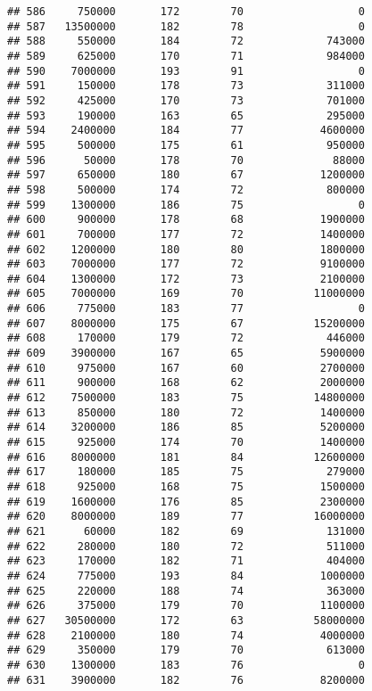 \documentclass[
]{article}
\begin{document}
\begin{verbatim}
## 586     750000       172        70                  0
## 587   13500000       182        78                  0
## 588     550000       184        72             743000
## 589     625000       170        71             984000
## 590    7000000       193        91                  0
## 591     150000       178        73             311000
## 592     425000       170        73             701000
## 593     190000       163        65             295000
## 594    2400000       184        77            4600000
## 595     500000       175        61             950000
## 596      50000       178        70              88000
## 597     650000       180        67            1200000
## 598     500000       174        72             800000
## 599    1300000       186        75                  0
## 600     900000       178        68            1900000
## 601     700000       177        72            1400000
## 602    1200000       180        80            1800000
## 603    7000000       177        72            9100000
## 604    1300000       172        73            2100000
## 605    7000000       169        70           11000000
## 606     775000       183        77                  0
## 607    8000000       175        67           15200000
## 608     170000       179        72             446000
## 609    3900000       167        65            5900000
## 610     975000       167        60            2700000
## 611     900000       168        62            2000000
## 612    7500000       183        75           14800000
## 613     850000       180        72            1400000
## 614    3200000       186        85            5200000
## 615     925000       174        70            1400000
## 616    8000000       181        84           12600000
## 617     180000       185        75             279000
## 618     925000       168        75            1500000
## 619    1600000       176        85            2300000
## 620    8000000       189        77           16000000
## 621      60000       182        69             131000
## 622     280000       180        72             511000
## 623     170000       182        71             404000
## 624     775000       193        84            1000000
## 625     220000       188        74             363000
## 626     375000       179        70            1100000
## 627   30500000       172        63           58000000
## 628    2100000       180        74            4000000
## 629     350000       179        70             613000
## 630    1300000       183        76                  0
## 631    3900000       182        76            8200000

\end{verbatim}
\end{document}
